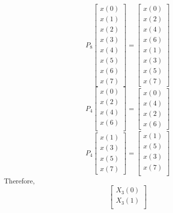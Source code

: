 \documentclass[journal,12pt,twocolumn]{IEEEtran}
\renewcommand\thesection{\arabic{section}}
\begin{document}
\begin{enumerate}[label=\thesection.\arabic*.,ref=\thesection.\theenumi]
\begin{equation}
P_{8}
\begin{bmatrix}
x(0) \\ 
x(1) \\ 
x(2) \\ 
x(3) \\ 
x(4) \\ 
x(5) \\
x(6) \\
x(7)
\end{bmatrix}
 = 
\begin{bmatrix}
x(0) \\ 
x(2) \\ 
x(4) \\ 
x(6) \\
x(1) \\ 
x(3) \\ 
x(5) \\
x(7)
\end{bmatrix}
\end{equation}
\begin{equation}
P_{4}
\begin{bmatrix}
x(0) \\ 
x(2) \\ 
x(4) \\ 
x(6) \\
\end{bmatrix}
 = 
\begin{bmatrix}
x(0) \\ 
x(4) \\ 
x(2) \\
x(6)
\end{bmatrix}
\end{equation}
\begin{equation}
P_{4}
\begin{bmatrix}
x(1) \\ 
x(3) \\ 
x(5) \\
x(7)
\end{bmatrix}
 = 
\begin{bmatrix}
x(1) \\ 
x(5) \\ 
x(3) \\ 
x(7) \\
\end{bmatrix}
\end{equation}
Therefore,
\begin{equation}
\begin{bmatrix}
X_{3}(0) \\ 
X_{3}(1)\\ 

\end{bmatrix}
\end{equation}
\end{enumerate}
\end{document}
